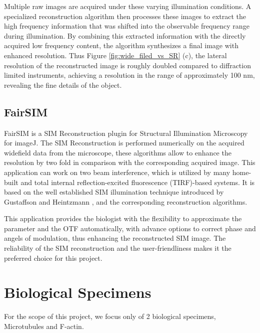 \documentclass[11pt,
  paper=a4, 
  bibliography=totocnumbered,
	captions=tableheading,
	BCOR=10mm
]{scrreprt}
\theoremstyle{definition}
\newcommand{\figureref}[1]{Figure \ref{#1}}
\begin{document}
\vspace{1cm}
\noindent
Multiple raw images are acquired under these varying illumination conditions. A specialized reconstruction algorithm then processes these images to extract 
the high frequency information that was shifted into the observable frequency range during illumination. By combining this extracted information 
with the directly acquired low frequency content, the algorithm synthesizes a final image with enhanced resolution. Thus \figureref{fig:wide_filed_vs_SR} (c), the lateral resolution 
of the reconstructed image is roughly doubled compared to diffraction limited instruments, achieving a resolution in the range of approximately 100 nm, revealing the fine details of the object.



\subsection{FairSIM} 
\label{sec:fairsim}

FairSIM is a SIM Reconstruction plugin for Structural Illumination Microscopy for imageJ.
The SIM Reconstruction is performed numerically on the acquired widefield data from the microscope,
these algorithms allow to enhance the resolution by two fold in comparison with the corresponding acquired image. \cite{fairSIM}
This application can work on two beam interference, which is utilized by many home-built and total internal reflection-excited 
fluorescence (TIRF)-based systems. It is based on the well established SIM illumination technique introduced 
by Gustaffson and Heintzmann \cite{gustafson} \cite{heintzmann} , and the corresponding reconstruction algorithms.

\vspace{1cm}
\noindent
This application provides the biologist with the flexibility to approximate the parameter and the OTF automatically, 
with advance options to correct phase and angels of modulation, thus enhancing the reconstructed SIM image. 
The reliability of the SIM reconstruction and the user-friendliness makes it the preferred  choice for this project. 

\vspace{1cm}
\noindent

\section{Biological Specimens}

For the scope of this project, we focus only of 2 biological specimens, Microtubules and F-actin. 
\end{document}
